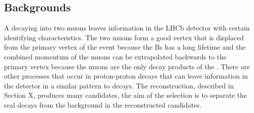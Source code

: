 \subsection{Backgrounds}
\label{sec:backgroundoutline}
A \bs decaying into two muons leaves information in the LHCb detector with certain identifying characteristics. The two muons form a good vertex that is displaced from the primary vertex of the event because the Bs has a long lifetime and the combined momentum of the muons can be extrapolated backwards to the primary vertex because the muons are the only decay products of the \bs. There are other processes that occur in proton-proton decays that can leave information in the detector in a similar pattern to \bsmumu decays. The reconstruction, described in Section X, produces many \bsmumu candidates, the aim of the selection is to separate the real \bsmumu decays from the background in the reconstructed candidates.


